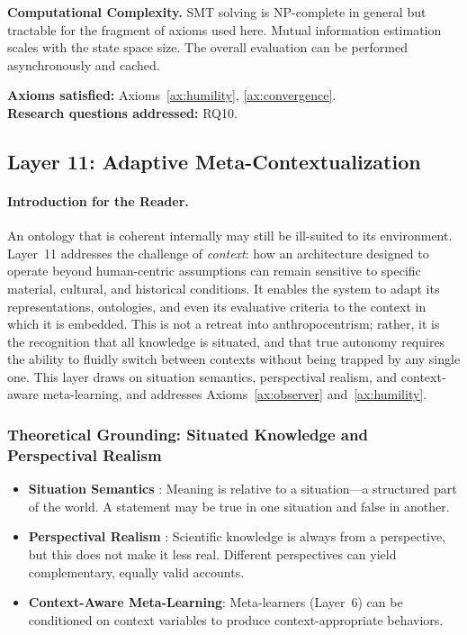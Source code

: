 \textbf{Computational Complexity.} SMT solving is NP-complete in general but tractable for the fragment of axioms used here. Mutual information estimation scales with the state space size. The overall evaluation can be performed asynchronously and cached.

\textbf{Axioms satisfied:} Axioms~\ref{ax:humility}, \ref{ax:convergence}. \\
\textbf{Research questions addressed:} RQ10.

\subsection{Layer 11: Adaptive Meta-Contextualization}
\label{subsec:layer11}

\paragraph{Introduction for the Reader.}
An ontology that is coherent internally may still be ill-suited to its environment. Layer~11 addresses the challenge of \emph{context}: how an architecture designed to operate beyond human-centric assumptions can remain sensitive to specific material, cultural, and historical conditions. It enables the system to adapt its representations, ontologies, and even its evaluative criteria to the context in which it is embedded. This is not a retreat into anthropocentrism; rather, it is the recognition that all knowledge is situated, and that true autonomy requires the ability to fluidly switch between contexts without being trapped by any single one. This layer draws on situation semantics, perspectival realism, and context-aware meta-learning, and addresses Axioms~\ref{ax:observer} and~\ref{ax:humility}.

\subsubsection{Theoretical Grounding: Situated Knowledge and Perspectival Realism}
\begin{itemize}
    \item \textbf{Situation Semantics} \cite{barwise1983}: Meaning is relative to a situation—a structured part of the world. A statement may be true in one situation and false in another.
    \item \textbf{Perspectival Realism} \cite{massimi2022}: Scientific knowledge is always from a perspective, but this does not make it less real. Different perspectives can yield complementary, equally valid accounts.
    \item \textbf{Context-Aware Meta-Learning}: Meta-learners (Layer~6) can be conditioned on context variables to produce context-appropriate behaviors.
\end{itemize}

